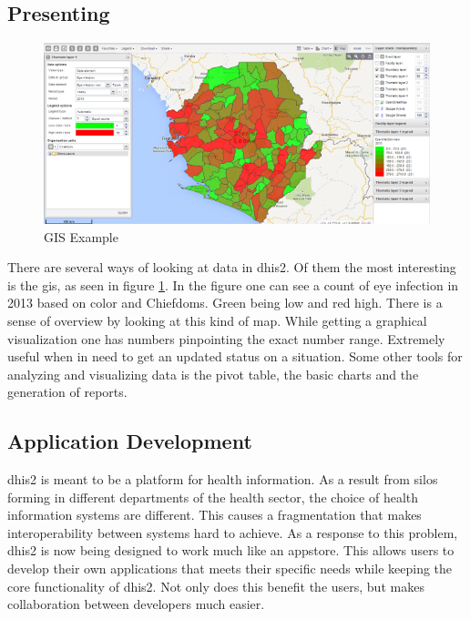\subsection{Presenting}
\begin{figure}
\centering
\includegraphics[width=\columnwidth]{context/img/gisExample}
\caption{GIS Example}
\label{fig:gis}
\end{figure}
There are several ways of looking at data in \gls{dhis2}. Of them the most interesting is the \gls{gis}, as seen in figure \ref{fig:gis}. In the figure one can see a count of eye infection in 2013 based on color and Chiefdoms. Green being low and red high. There is a sense of overview by looking at this kind of map. While getting a graphical visualization one has numbers pinpointing the exact number range. Extremely useful when in need to get an updated status on a situation. Some other tools for analyzing and visualizing data is the pivot table, the basic charts and the generation of reports.

\subsection{Application Development}
\gls{dhis2} is meant to be a platform for health information. As a result from silos forming in different departments of the health sector, the choice of health information systems are different. This causes a fragmentation that makes interoperability between systems hard to achieve. As a response to this problem, \gls{dhis2} is now being designed to work much like an appstore. This allows users to develop their own applications that meets their specific needs while keeping the core functionality of \gls{dhis2}. Not only does this benefit the users, but makes collaboration between developers much easier. 


